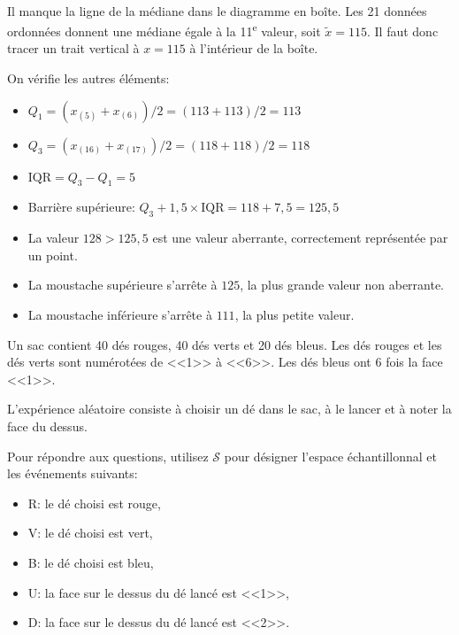 \begin{questions}
\begin{center}
\\
	\end{center}

\begin{solution}
    Il manque la ligne de la médiane dans le diagramme en boîte. Les 21 données ordonnées donnent une médiane égale à la 11\textsuperscript{e} valeur, soit $\tilde{x}=115$. Il faut donc tracer un trait vertical à $x=115$ à l'intérieur de la boîte.

    On vérifie les autres éléments:
    \begin{itemize}
        \item $Q_1 = (x_{(5)}+x_{(6)})/2=(113+113)/2=113$ \checkmark
        \item $Q_3 = (x_{(16)}+x_{(17)})/2=(118+118)/2=118$ \checkmark
        \item $\text{IQR}=Q_3 - Q_1 = 5$
        \item Barrière supérieure: $Q_3+1{,}5\times\text{IQR}=118+7{,}5=125{,}5$
        \item La valeur $128 > 125{,}5$ est une valeur aberrante, correctement représentée par un point. \checkmark
        \item La moustache supérieure s'arrête à $125$, la plus grande valeur non aberrante. \checkmark
        \item La moustache inférieure s'arrête à $111$, la plus petite valeur. \checkmark
    \end{itemize}
\end{solution}

\pageblanche

\question Un sac contient 40 dés rouges, 40 dés verts et 20 dés bleus.
Les dés rouges et les dés verts sont numérotées de <<1>> à <<6>>.
Les dés bleus ont 6 fois la face <<1>>.

L'expérience aléatoire consiste à choisir un dé dans le sac, à le lancer et à noter la face du dessus.

Pour répondre aux questions, utilisez $\mathcal{S}$ pour désigner l'espace échantillonnal et les événements suivants:

\begin{itemize}
    \item R: le dé choisi est rouge,
    \item V: le dé choisi est vert,
    \item B: le dé choisi est bleu,
    \item U: la face sur le dessus du dé lancé est <<1>>,
    \item D: la face sur le dessus du dé lancé est <<2>>.
\end{itemize}


\end{questions}

